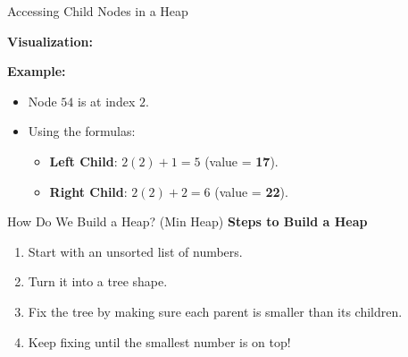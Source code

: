 \begin{frame}{Accessing Child Nodes in a Heap}
       
    \textbf{Visualization:}
    \begin{center}
    \end{center}

    \vspace{0.2cm}
    
    \textbf{Example:}
    \begin{itemize}
        \item Node \( 54 \) is at index \( 2 \).
        \item Using the formulas:
        \begin{itemize}
            \item \textbf{Left Child}: \( 2(2) + 1 = 5 \) (value = \textbf{17}).
            \item \textbf{Right Child}: \( 2(2) + 2 = 6 \) (value = \textbf{22}).
        \end{itemize}
    \end{itemize}
\end{frame}


\begin{frame}{How Do We Build a Heap?  (Min Heap)}
\textbf{Steps to Build a Heap}
\begin{enumerate}
\item Start with an unsorted list of numbers.
\item Turn it into a tree shape.
\item Fix the tree by making sure each parent is smaller than its children.
\item Keep fixing until the smallest number is on top!
\end{enumerate}
\end{frame}

